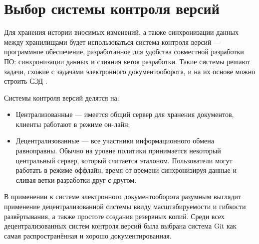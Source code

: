 \section{Выбор системы контроля версий} \label{technologic_cvs}

Для хранения истории вносимых изменений, а также синхронизации данных между хранилищами будет использоваться система контроля версий --- программное обеспечение, разработанное для удобства совместной разработки ПО: синхронизации данных и слияния веток разработки. Такие системы решают задачи, схожие с задачами  электронного документооборота, и на их основе можно строить СЭД \cite{my_conference_2013}.

\vspace{\baselineskip}
Системы контроля версий делятся на:
\begin{itemize}
		\item Централизованные --- имеется общий сервер для хранения документов, клиенты работают в режиме он-лайн;
		\item Децентрализованные --- все участники информационного обмена равноправны. Обычно на уровне политики принимается некоторый центральный сервер, который считается эталоном. Пользователи могут работать в режиме оффлайн, время от времени синхронизируя данные и сливая ветки разработки друг с другом.
	\end{itemize}

\vspace{\baselineskip}
В применении к системе электронного документооборота разумным выглядит применение децентрализованной системы ввиду масштабируемости и гибкости развёртывания, а также простоте создания резервных копий. Среди всех децентрализованных систем контроля версий была выбрана система Git как самая распространённая и хорошо документированная.